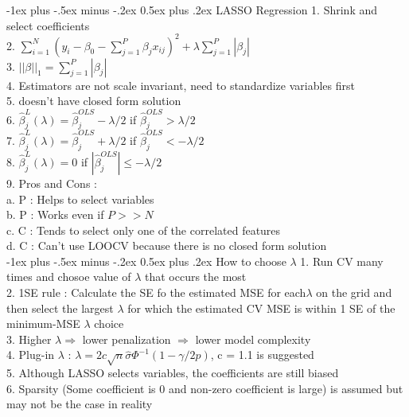 \documentclass[10pt,landscape]{article}
\makeatletter
\renewcommand{\section}{\@startsection{section}{1}{0mm}%
                                {-1ex plus -.5ex minus -.2ex}%
                                {0.5ex plus .2ex}%
                                {\normalfont\large\bfseries}}
\makeatother
\begin{document}
\begin{multicols}{4}
\section{LASSO Regression}
1. Shrink and select coefficients\\
2. $\sum_{i=1}^N (y_i - \beta_0 - \sum_{j=1}^P \beta_j x_{ij})^2 + \lambda \sum_{j=1}^P |\beta_j|$\\
3. $||\beta||_1 = \sum_{j=1}^P |\beta_j|$\\
4. Estimators are not scale invariant, need to standardize variables first\\
5. doesn't have closed form solution\\
6. $\hat{\beta}_j^L(\lambda) = \hat{\beta}_j^{OLS} - \lambda/2$ if $\hat{\beta}_j^{OLS} > \lambda/2$\\
7. $\hat{\beta}_j^L(\lambda) = \hat{\beta}_j^{OLS} + \lambda/2$ if $\hat{\beta}_j^{OLS} < -\lambda/2$\\
8. $\hat{\beta}_j^L(\lambda) = 0$ if $|\hat{\beta}_j^{OLS}| \leq -\lambda/2$\\
9. Pros and Cons : \\
a. P : Helps to select variables\\
b. P : Works even if $P >> N$\\
c. C : Tends to select only one of the correlated features\\
d. C : Can't use LOOCV because there is no closed form solution\\

\section{How to choose $\lambda$}
1. Run CV many times and chosoe value of $\lambda$ that occurs the most\\
2. 1SE rule : Calculate the SE fo the estimated MSE for each$\lambda$ on the grid and then select the largest $\lambda$ for which the estimated CV MSE is within 1 SE of the minimum-MSE $\lambda$ choice\\
3. Higher $\lambda \Rightarrow$ lower penalization $\Rightarrow$ lower model complexity\\
4. Plug-in $\lambda$ : $\lambda = 2c\sqrt{n}\hat{\sigma}\Phi^{-1}(1-\gamma/2p)$, c = 1.1 is suggested \\
5. Although LASSO selects variables, the coefficients are still biased\\
6. Sparsity (Some coefficient is 0 and non-zero coefficient is large) is assumed but may not be the case in reality \\


\end{multicols}
\end{document}
